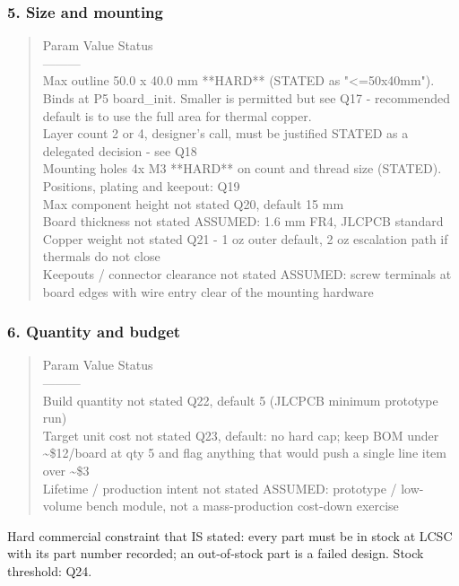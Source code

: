 \documentclass[11pt,a4paper]{article}
\begin{document}
\subsubsection*{5. Size and mounting}
\begin{quote}\small\ttfamily\raggedright
\textbar{} Param \textbar{} Value \textbar{} Status \textbar{}\\
\textbar{}---\textbar{}---\textbar{}---\textbar{}\\
\textbar{} Max outline \textbar{} 50.0 x 40.0 mm \textbar{} {*}{*}HARD{*}{*} (STATED as "\textless{}=50x40mm"). Binds at P5 board\_init. Smaller is permitted but see Q17 - recommended default is to use the full area for thermal copper. \textbar{}\\
\textbar{} Layer count \textbar{} 2 or 4, designer's call, must be justified \textbar{} STATED as a delegated decision - see Q18 \textbar{}\\
\textbar{} Mounting holes \textbar{} 4x M3 \textbar{} {*}{*}HARD{*}{*} on count and thread size (STATED). Positions, plating and keepout: Q19 \textbar{}\\
\textbar{} Max component height \textbar{} not stated \textbar{} Q20, default 15 mm \textbar{}\\
\textbar{} Board thickness \textbar{} not stated \textbar{} ASSUMED: 1.6 mm FR4, JLCPCB standard \textbar{}\\
\textbar{} Copper weight \textbar{} not stated \textbar{} Q21 - 1 oz outer default, 2 oz escalation path if thermals do not close \textbar{}\\
\textbar{} Keepouts / connector clearance \textbar{} not stated \textbar{} ASSUMED: screw terminals at board edges with wire entry clear of the mounting hardware \textbar{}
\end{quote}
\subsubsection*{6. Quantity and budget}
\begin{quote}\small\ttfamily\raggedright
\textbar{} Param \textbar{} Value \textbar{} Status \textbar{}\\
\textbar{}---\textbar{}---\textbar{}---\textbar{}\\
\textbar{} Build quantity \textbar{} not stated \textbar{} Q22, default 5 (JLCPCB minimum prototype run) \textbar{}\\
\textbar{} Target unit cost \textbar{} not stated \textbar{} Q23, default: no hard cap; keep BOM under \textasciitilde{}\$12/board at qty 5 and flag anything that would push a single line item over \textasciitilde{}\$3 \textbar{}\\
\textbar{} Lifetime / production intent \textbar{} not stated \textbar{} ASSUMED: prototype / low-volume bench module, not a mass-production cost-down exercise \textbar{}
\end{quote}
Hard commercial constraint that IS stated: every part must be in stock at LCSC with its part number recorded; an out-of-stock part is a failed design. Stock threshold: Q24.
\end{document}
